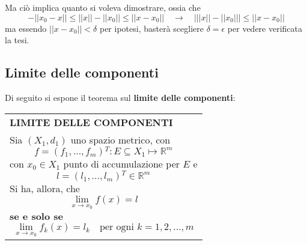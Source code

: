 \documentclass[a4paper]{extarticle}
\renewcommand\arraystretch{}
\begin{document}
Ma ciò implica quanto si voleva dimostrare, ossia che
\[- \left \vert \left \vert x_0-x \right \vert \right \vert \leq \left \vert \left \vert x \right \vert \right \vert - \left \vert \left \vert x_0 \right \vert \right \vert \leq \left \vert \left \vert x-x_0 \right \vert \right \vert \hspace{1em} \rightarrow \hspace{1em} \left \vert \left \vert \left \vert x \right \vert \right \vert - \left \vert \left \vert x_0 \right \vert \right \vert \right \vert \leq \left \vert \left \vert x-x_0 \right \vert \right \vert\]
ma essendo $\left \vert \left \vert x-x_0 \right \vert \right \vert < \delta$ per ipotesi, basterà scegliere $\delta=\epsilon$ per vedere verificata la tesi.


\vspace{1em}
\noindent
\subsection{Limite delle componenti}
Di seguito si espone il teorema sul \textbf{limite delle componenti}:

\vspace{1em}
\setlength{\tabcolsep}{14pt}
\renewcommand{\arraystretch}{2}
\noindent
\begin{tabularx}{\textwidth}{@{}|P|@{}}
    \hline
    {\textbf{LIMITE DELLE COMPONENTI}}\\
    \parbox{\linewidth}{Sia $(X_1,d_1)$ uno spazio metrico, con
    \[f=(f_1,\dots,f_m){^T} : E \subseteq X_1 \longmapsto \mathbb{R}^m\]
    con $x_0 \in X_1$ punto di accumulazione per $E$ e
    \[l = (l_1,\dots,l_m){^T} \in \mathbb{R}^m\]
    Si ha, allora, che
    \[\lim_{x \to x_0} f(x) = l\]
    \textbf{se e solo se}
    \[\lim_{x \to x_0} f_k(x) = l_k \hspace{1em} \text{per ogni } k =1,2,\dots,m\]
     \vspace{-1mm}}\\
    \hline
\end{tabularx}
\end{document}
